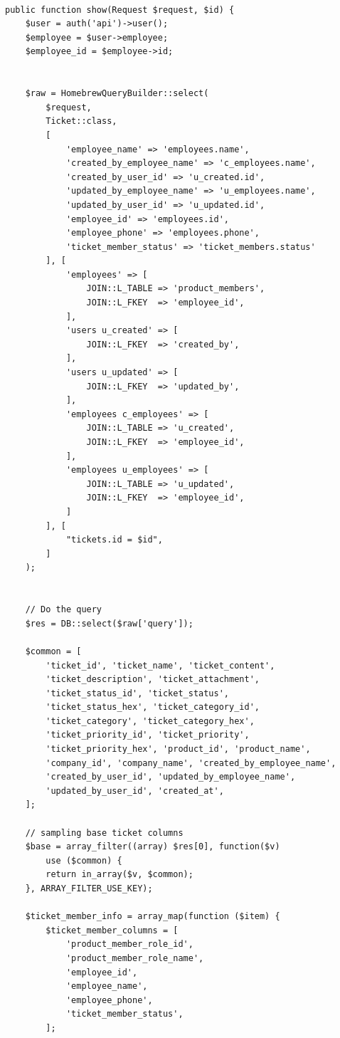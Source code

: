 \documentclass[12pt]{article}
\begin{document}
\begin{enumerate}[label=\textbf{5.\arabic*.}]
\begin{enumerate}[label=\textbf{5.1.\arabic*.}]
\begin{enumerate}[label=\arabic*.,wide, labelwidth=!, labelindent=0pt]
            \begin{lstlisting}

public function show(Request $request, $id) {
    $user = auth('api')->user();
    $employee = $user->employee;
    $employee_id = $employee->id;


    $raw = HomebrewQueryBuilder::select(
        $request,
        Ticket::class,
        [
            'employee_name' => 'employees.name',
            'created_by_employee_name' => 'c_employees.name',
            'created_by_user_id' => 'u_created.id',
            'updated_by_employee_name' => 'u_employees.name',
            'updated_by_user_id' => 'u_updated.id',
            'employee_id' => 'employees.id',
            'employee_phone' => 'employees.phone',
            'ticket_member_status' => 'ticket_members.status'
        ], [
            'employees' => [
                JOIN::L_TABLE => 'product_members',
                JOIN::L_FKEY  => 'employee_id',
            ], 
            'users u_created' => [
                JOIN::L_FKEY  => 'created_by',
            ], 
            'users u_updated' => [
                JOIN::L_FKEY  => 'updated_by',
            ], 
            'employees c_employees' => [
                JOIN::L_TABLE => 'u_created',
                JOIN::L_FKEY  => 'employee_id',
            ], 
            'employees u_employees' => [
                JOIN::L_TABLE => 'u_updated',
                JOIN::L_FKEY  => 'employee_id',
            ]
        ], [
            "tickets.id = $id",
        ]
    );
    

    // Do the query
    $res = DB::select($raw['query']);
    
    $common = [
        'ticket_id', 'ticket_name', 'ticket_content',
        'ticket_description', 'ticket_attachment',
        'ticket_status_id', 'ticket_status',
        'ticket_status_hex', 'ticket_category_id',
        'ticket_category', 'ticket_category_hex',
        'ticket_priority_id', 'ticket_priority',
        'ticket_priority_hex', 'product_id', 'product_name', 
        'company_id', 'company_name', 'created_by_employee_name', 
        'created_by_user_id', 'updated_by_employee_name', 
        'updated_by_user_id', 'created_at',
    ];

    // sampling base ticket columns
    $base = array_filter((array) $res[0], function($v) 
        use ($common) {
        return in_array($v, $common);
    }, ARRAY_FILTER_USE_KEY);

    $ticket_member_info = array_map(function ($item) {
        $ticket_member_columns = [
            'product_member_role_id',
            'product_member_role_name',
            'employee_id',
            'employee_name',
            'employee_phone',
            'ticket_member_status',
        ];


\end{lstlisting}
\end{enumerate}
\end{enumerate}
\end{enumerate}
\end{document}
